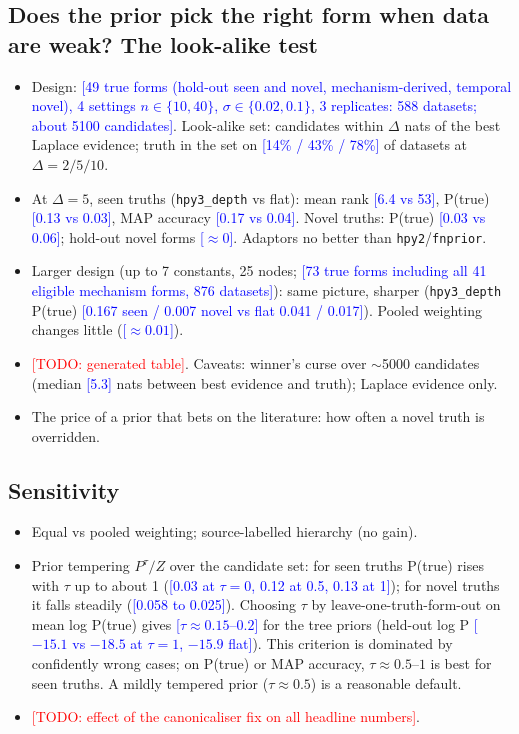 \documentclass[11pt]{article}
\newcommand{\cur}[1]{\textcolor{blue}{[#1]}}
\newcommand{\todo}[1]{\textcolor{red}{[TODO: #1]}}
\begin{document}
\subsection{Does the prior pick the right form when data are weak? The look-alike test}
\begin{itemize}
  \item Design: \cur{49 true forms (hold-out seen and novel, mechanism-derived, temporal novel), 4
  settings $n \in \{10, 40\}$, $\sigma \in \{0.02, 0.1\}$, 3 replicates: 588 datasets; about 5100
  candidates}. Look-alike set: candidates within $\Delta$ nats of the best Laplace evidence; truth
  in the set on \cur{14\% / 43\% / 78\%} of datasets at $\Delta = 2 / 5 / 10$.
  \item At $\Delta = 5$, seen truths (\texttt{hpy3\_depth} vs flat): mean rank \cur{6.4 vs 53}, P(true)
  \cur{0.13 vs 0.03}, MAP accuracy \cur{0.17 vs 0.04}. Novel truths: P(true) \cur{0.03 vs 0.06};
  hold-out novel forms \cur{$\approx 0$}. Adaptors no better than \texttt{hpy2}/\texttt{fnprior}.
  \item Larger design (up to 7 constants, 25 nodes; \cur{73 true forms including all 41 eligible
  mechanism forms, 876 datasets}): same picture, sharper (\texttt{hpy3\_depth} P(true) \cur{0.167 seen
  / 0.007 novel vs flat 0.041 / 0.017}). Pooled weighting changes little (\cur{$\approx 0.01$}).
  \item \todo{generated table}. Caveats: winner's curse over $\sim$5000 candidates (median \cur{5.3} nats
  between best evidence and truth); Laplace evidence only.
  \item The price of a prior that bets on the literature: how often a novel truth is overridden.
\end{itemize}

\subsection{Sensitivity}
\begin{itemize}
  \item Equal vs pooled weighting; source-labelled hierarchy (no gain).
  \item Prior tempering $P^\tau/Z$ over the candidate set: for seen truths P(true) rises with $\tau$
  up to about 1 (\cur{0.03 at $\tau=0$, 0.12 at 0.5, 0.13 at 1}); for novel truths it falls steadily
  (\cur{0.058 to 0.025}). Choosing $\tau$ by leave-one-truth-form-out on mean log P(true) gives
  \cur{$\tau \approx 0.15$--$0.2$} for the tree priors (held-out log P \cur{$-15.1$ vs $-18.5$ at $\tau=1$,
  $-15.9$ flat}). This criterion is dominated by confidently wrong cases; on P(true) or MAP
  accuracy, $\tau \approx 0.5$--$1$ is best for seen truths. A mildly tempered prior
  ($\tau \approx 0.5$) is a reasonable default.
  \item \todo{effect of the canonicaliser fix on all headline numbers}.
\end{itemize}
\end{document}
